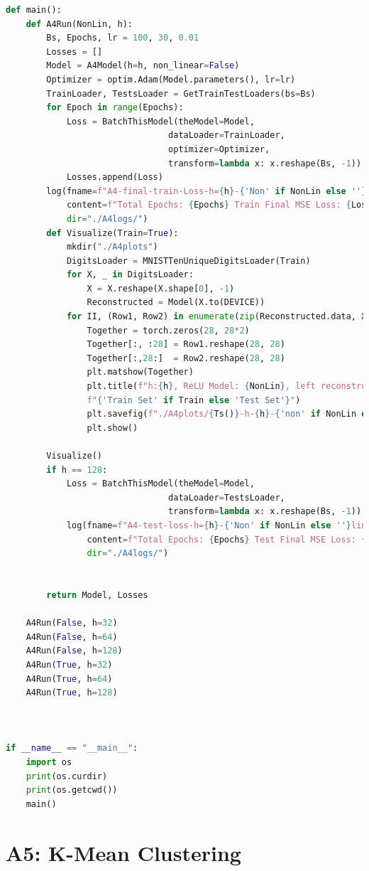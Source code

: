 \documentclass[]{article}
\begin{document}
\begin{lstlisting}[language=python]
def main():
    def A4Run(NonLin, h):
        Bs, Epochs, lr = 100, 30, 0.01
        Losses = []
        Model = A4Model(h=h, non_linear=False)
        Optimizer = optim.Adam(Model.parameters(), lr=lr)
        TrainLoader, TestsLoader = GetTrainTestLoaders(bs=Bs)
        for Epoch in range(Epochs):
            Loss = BatchThisModel(theModel=Model,
                                dataLoader=TrainLoader,
                                optimizer=Optimizer,
                                transform=lambda x: x.reshape(Bs, -1))
            Losses.append(Loss)
        log(fname=f"A4-final-train-Loss-h={h}-{'Non' if NonLin else ''}lin-model",
            content=f"Total Epochs: {Epochs} Train Final MSE Loss: {Losses[-1]}",
            dir="./A4logs/")
        def Visualize(Train=True):
            mkdir("./A4plots")
            DigitsLoader = MNISTTenUniqueDigitsLoader(Train)
            for X, _ in DigitsLoader:
                X = X.reshape(X.shape[0], -1)
                Reconstructed = Model(X.to(DEVICE))
            for II, (Row1, Row2) in enumerate(zip(Reconstructed.data, X.data)):
                Together = torch.zeros(28, 28*2)
                Together[:, :28] = Row1.reshape(28, 28)
                Together[:,28:]  = Row2.reshape(28, 28)
                plt.matshow(Together)
                plt.title(f"h:{h}, ReLU Model: {NonLin}, left reconstructed, right Original\n"
                f"{'Train Set' if Train else 'Test Set'}")
                plt.savefig(f"./A4plots/{Ts()}-h-{h}-{'non' if NonLin else ''}lin-digit-{II}.png")
                plt.show()

        Visualize()
        if h == 128:
            Loss = BatchThisModel(theModel=Model,
                                dataLoader=TestsLoader,
                                transform=lambda x: x.reshape(Bs, -1))
            log(fname=f"A4-test-loss-h={h}-{'Non' if NonLin else ''}lin-model",
                content=f"Total Epochs: {Epochs} Test Final MSE Loss: {Loss}",
                dir="./A4logs/")


        return Model, Losses

    A4Run(False, h=32)
    A4Run(False, h=64)
    A4Run(False, h=128)
    A4Run(True, h=32)
    A4Run(True, h=64)
    A4Run(True, h=128)



if __name__ == "__main__":
    import os
    print(os.curdir)
    print(os.getcwd())
    main()
        \end{lstlisting}
    
    
\section*{A5: K-Mean Clustering}
\end{document}
